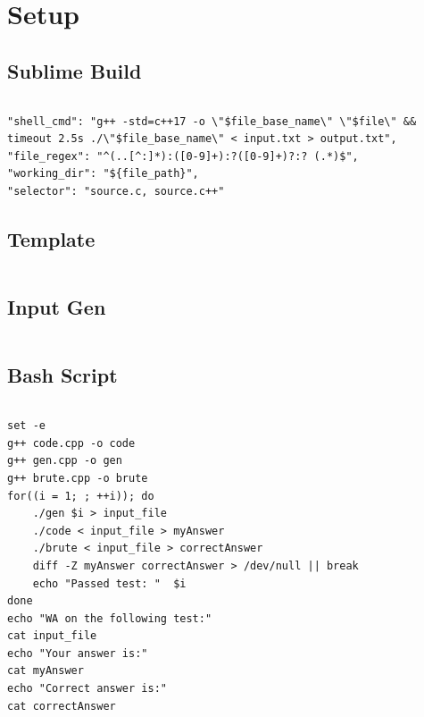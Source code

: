 \section{Setup}
\subsection{\small Sublime Build  \scriptsize}
\inputminted[breaklines, breakanywhere]{c++}{code/01-Setup/01-Sublime Build.cpp}

\begin{verbatim}
"shell_cmd": "g++ -std=c++17 -o \"$file_base_name\" \"$file\" && timeout 2.5s ./\"$file_base_name\" < input.txt > output.txt",
"file_regex": "^(..[^:]*):([0-9]+):?([0-9]+)?:? (.*)$",
"working_dir": "${file_path}",
"selector": "source.c, source.c++"
\end{verbatim}


\subsection{\small Template  \scriptsize}
\inputminted[breaklines, breakanywhere]{c++}{code/01-Setup/05-Template.cpp}

\subsection{\small Input Gen  \scriptsize}
\inputminted[breaklines, breakanywhere]{c++}{code/01-Setup/06-Input Gen.cpp}

\subsection{\small Bash Script  \scriptsize}
\inputminted[breaklines, breakanywhere]{c++}{code/01-Setup/07-Bash Script.cpp}

\begin{verbatim}
set -e
g++ code.cpp -o code
g++ gen.cpp -o gen
g++ brute.cpp -o brute
for((i = 1; ; ++i)); do
    ./gen $i > input_file
    ./code < input_file > myAnswer
    ./brute < input_file > correctAnswer
    diff -Z myAnswer correctAnswer > /dev/null || break
    echo "Passed test: "  $i
done
echo "WA on the following test:"
cat input_file
echo "Your answer is:"
cat myAnswer
echo "Correct answer is:"
cat correctAnswer
\end{verbatim}


